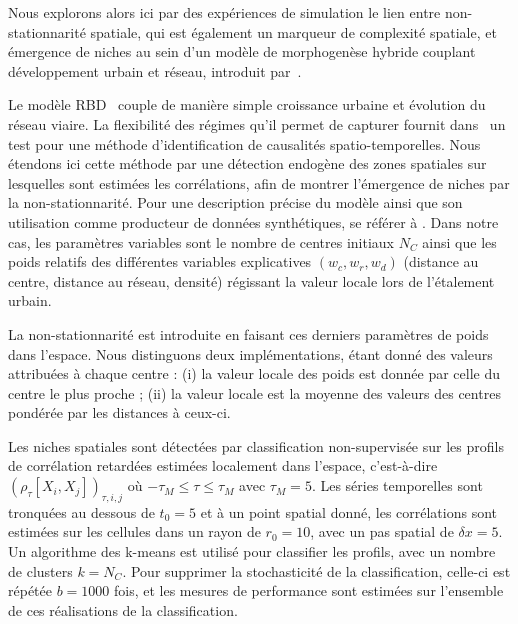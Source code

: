 \documentclass[11pt]{article}
\begin{document}
Nous explorons alors ici par des expériences de simulation le lien entre non-stationnarité spatiale, qui est également un marqueur de complexité spatiale, et émergence de niches au sein d'un modèle de morphogenèse hybride couplant développement urbain et réseau, introduit par~\cite{raimbault2014hybrid}.

Le modèle RBD~\citep{raimbault2014hybrid} couple de manière simple croissance urbaine et évolution du réseau viaire. La flexibilité des régimes qu'il permet de capturer fournit dans~\cite{raimbault2017identification} un test pour une méthode d'identification de causalités spatio-temporelles. Nous étendons ici cette méthode par une détection endogène des zones spatiales sur lesquelles sont estimées les corrélations, afin de montrer l'émergence de niches par la non-stationnarité. Pour une description précise du modèle ainsi que son utilisation comme producteur de données synthétiques, se référer à \cite{raimbault2018caracterisation}. Dans notre cas, les paramètres variables sont le nombre de centres initiaux $N_C$ ainsi que les poids relatifs des différentes variables explicatives $(w_c,w_r,w_d)$ (distance au centre, distance au réseau, densité) régissant la valeur locale lors de l'étalement urbain.


La non-stationnarité est introduite en faisant ces derniers paramètres de poids dans l'espace. Nous distinguons deux implémentations, étant donné des valeurs attribuées à chaque centre : (i) la valeur locale des poids est donnée par celle du centre le plus proche ; (ii) la valeur locale est la moyenne des valeurs des centres pondérée par les distances à ceux-ci.

Les niches spatiales sont détectées par classification non-supervisée sur les profils de corrélation retardées estimées localement dans l'espace, c'est-à-dire $(\rho_{\tau}\left[X_i,X_j\right])_{\tau,i,j}$ où $- \tau_M \leq \tau \leq  \tau_M$ avec $\tau_M = 5$. Les séries temporelles sont tronquées au dessous de $t_0 = 5$ et à un point spatial donné, les corrélations sont estimées sur les cellules dans un rayon de $r_0 = 10$, avec un pas spatial de $\delta x = 5$. Un algorithme des k-means est utilisé pour classifier les profils, avec un nombre de clusters $k = N_C$. Pour supprimer la stochasticité de la classification, celle-ci est répétée $b = 1000$ fois, et les mesures de performance sont estimées sur l'ensemble de ces réalisations de la classification.
\end{document}
